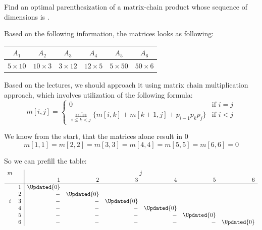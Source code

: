 \item[\textbf{Exercise 14.2-1}]
Find an optimal parenthesization of a matrix-chain product whose sequence of
dimensions is . 

\Solution

Based on the following information, the matrices looks as following:

\begin{tabularx}{\linewidth}{ C | C | C | C | C | C }
    $    A_1$     &      $A_2$    &     $A_3$     &      $A_4$    &     $A_5$     &      $A_6$    \\ \hline
    $5 \times 10$ & $10 \times 3$ & $3 \times 12$ & $12 \times 5$ & $5 \times 50$ & $50 \times 6$ \\
\end{tabularx}

Based on the lectures, we should approach it using matrix chain multiplication
approach, which involves utilization of the following formula:
$$
    m[i, j] =
    \begin{cases}
        0                                                            & \text{if } i = j \\
        \min_{i \le k < j} \{m[i, k] + m[k+1, j] + p_{i-1} p_k p_j\} & \text{if } i < j
    \end{cases}
$$



We know from the start, that the matrices alone result in $0$
\[
    m[1,1] = m[2,2] = m[3,3] = m[4,4] = m[5,5] = m[6,6] = 0
\]

So we can prefill the table:
\[
\begin{array}{cc|rrrrrr}
m &   & \multicolumn{6}{c}{j}                                                             \\
  &   &      1      &      2      &      3      &      4      &      5      &     6       \\
\hline
  & 1 & \Updated{0} &             &             &             &             &             \\
  & 2 &      -      & \Updated{0} &             &             &             &             \\
i & 3 &      -      &      -      & \Updated{0} &             &             &             \\
  & 4 &      -      &      -      &      -      & \Updated{0} &             &             \\
  & 5 &      -      &      -      &      -      &      -      & \Updated{0} &             \\
  & 6 &      -      &      -      &      -      &      -      &      -      & \Updated{0}
\end{array}
\]

